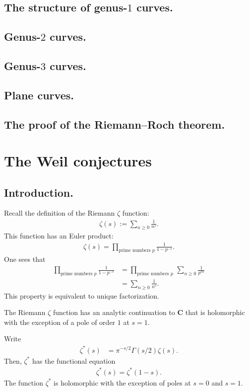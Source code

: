 \documentclass [11 pt, oneside] {article}
\begin{document}
\subsection{The structure of genus-\texorpdfstring{$1$}{1} curves.}
\subsection{Genus-\texorpdfstring{$2$}{2} curves.}
\subsection{Genus-\texorpdfstring{$3$}{3} curves.}
\subsection{Plane curves.}
\subsection{The proof of the Riemann--Roch theorem.}
\fi

\section{The Weil conjectures}
\subsection{Introduction.}
Recall the definition of the Riemann $\zeta$ function:
\begin{align*}
	\zeta(s) := \sum_{n\ge 0}^{} \frac{1}{n^s}.
\end{align*}
This function has an Euler product:
\begin{align*}
	\zeta(s) = \prod_{\textrm{prime numbers $p$}} \frac{1}{1-p^{-s}}.
\end{align*}
One sees that
\begin{align*}
	\prod_{\textrm{prime numbers $p$}} \frac{1}{1-p^{-s}} &= \prod_{\textrm{prime numbers $p$}} \,\sum_{n\ge 0}^{} \frac{1}{p^{ns}}\\
							     &= \sum_{n\ge 0}^{} \frac{1}{n^s}.
\end{align*}
This property is equivalent to unique factorization.

The Riemann $\zeta$ function has an analytic continuation to $\mathbf{C}$ that is holomorphic with the exception of a pole of order $1$ at $s=1$.

Write
\begin{align*}
	\zeta^*(s) &= \pi^{-s/2} \Gamma (s/2) \zeta (s).
\end{align*}
Then, $\zeta^*$ has the functional equation
\begin{align*}
	\zeta^*(s) = \zeta^* (1-s).
\end{align*}
The function $\zeta^*$ is holomorphic with the exception of poles at $s=0$ and $s=1$.
\end{document}

